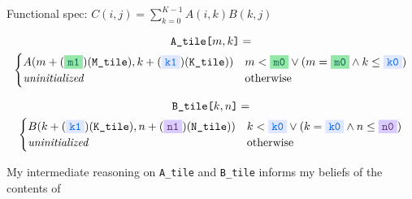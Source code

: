 \newpage
{}

{\large

}

{\LARGE

Functional spec: $C(i, j) = \sum_{k=0}^{K-1} A(i, k) B(k, j)$

}

\newpage
{}

{\large

}

{\LARGE

\vspace{-10mm}
\begin{gather*}
\texttt{A\_tile[$m,k$]} = \\
\begin{cases}
    A(m + (\greenBox{\texttt{m1}})(\texttt{M\_tile}), k + (\blueBox{\texttt{k1}})(\texttt{K\_tile}))
    &
    m < \greenBox{\texttt{m0}} \lor (m = \greenBox{\texttt{m0}} \land k \le \blueBox{\texttt{k0}}) \\
    \textit{uninitialized} & \text{otherwise}
\end{cases}
\end{gather*}

}

\newpage
{}

{\large

}

{\LARGE

\vspace{-10mm}
\begin{gather*}
\texttt{B\_tile[$k,n$]} = \\
\begin{cases}
    B(k + (\blueBox{\texttt{k1}})(\texttt{K\_tile}), n + (\violetBox{\texttt{n1}})(\texttt{N\_tile}))
    &
    k < \blueBox{\texttt{k0}} \lor (k = \blueBox{\texttt{k0}} \land n \le \violetBox{\texttt{n0}}) \\
    \textit{uninitialized} & \text{otherwise}
\end{cases}
\end{gather*}

}

\newpage
{}

{\large

}

{\LARGE

My intermediate reasoning on \texttt{A\_tile} and \texttt{B\_tile} informs my beliefs of the contents of 

}

